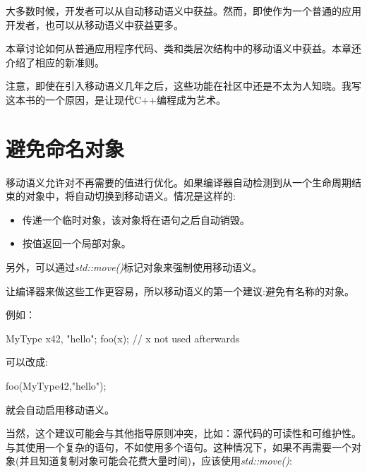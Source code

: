 
大多数时候，开发者可以从自动移动语义中获益。然而，即使作为一个普通的应用开发者，也可以从移动语义中获益更多。\par

本章讨论如何从普通应用程序代码、类和类层次结构中的移动语义中获益。本章还介绍了相应的新准则。\par

注意，即使在引入移动语义几年之后，这些功能在社区中还是不太为人知晓。我写这本书的一个原因，是让现代C++编程成为艺术。\par


\section{避免命名对象}

移动语义允许对不再需要的值进行优化。如果编译器自动检测到从一个生命周期结束的对象中，将自动切换到移动语义。情况是这样的:\par

\begin{itemize}
  \item 传递一个临时对象，该对象将在语句之后自动销毁。
  \item 按值返回一个局部对象。
\end{itemize}

另外，可以通过\textit{std::move()}标记对象来强制使用移动语义。\par

让编译器来做这些工作更容易，所以移动语义的第一个建议:避免有名称的对象。\par

例如：\par

\begin{codebox}[cpp]
MyType x{42, "hello"};
foo(x); // x not used afterwards
\end{codebox}

可以改成:\par

\begin{codebox}[cpp]
foo(MyType{42,"hello"});
\end{codebox}

就会自动启用移动语义。\par

当然，这个建议可能会与其他指导原则冲突，比如：源代码的可读性和可维护性。与其使用一个复杂的语句，不如使用多个语句。这种情况下，如果不再需要一个对象(并且知道复制对象可能会花费大量时间)，应该使用\textit{std::move()}:\par


